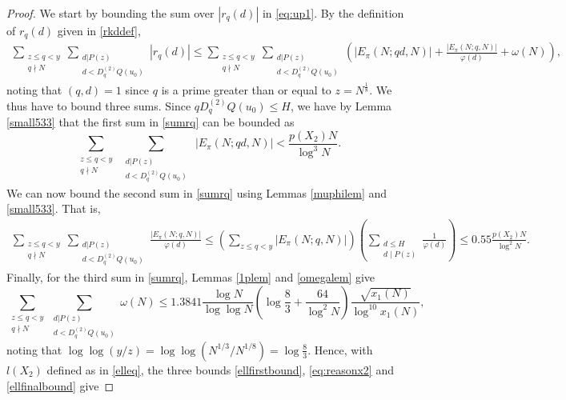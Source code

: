 \documentclass[12pt]{amsart}
\begin{document}
\begin{proof}
We start by bounding the sum over $|r_q(d)|$ in \eqref{eq:up1}. By the definition of $r_q(d)$ given in \eqref{rkddef},
\begin{align}\label{sumrq}
\sum_{\substack{z \le q < y\\q\nmid N}}\sum_{\substack{d|P(z)\\d<D^{(2)}_qQ(u_0)}}\left|r_{q} (d)\right|
\le \sum_{\substack{z \le q < y\\q\nmid N}}\sum_{\substack{d|P(z)\\d<D^{(2)}_qQ(u_0)}}\left(\left|E_{\pi}(N;qd,N)\right|+\frac{\left|E_{\pi}(N;q,N)\right|}{\varphi (d)}+\omega(N)\right),
\end{align}
noting that $(q,d)=1$ since $q$ is a prime greater than or equal to $z=N^{\frac{1}{8}}$. We thus have to bound three sums. Since $qD^{(2)}_qQ(u_0)\le H$, we have by Lemma \ref{small533} that the first sum in \eqref{sumrq} can be bounded as
\begin{equation}\label{ellfirstbound}
    \sum_{\substack{z \le q < y\\ q\nmid N}}\sum_{\substack{\substack{d|P(z)\\d<D^{(2)}_qQ(u_0)}}}\left|E_{\pi}(N;qd,N)\right| < \frac{p(X_2)N}{\log^3 N}.
\end{equation}
We can now bound the second sum in \eqref{sumrq} using Lemmas \ref{muphilem} and \ref{small533}. That is,
\begin{align}
\label{eq:reasonx2}
 \sum_{\substack{z \le q < y\\q\nmid N}}\sum_{\substack{d|P(z)\\d<D^{(2)}_qQ(u_0)}}\frac{\left|E_{\pi}(N;q,N)\right|}{\varphi (d)} \le \left(\sum_{z \le q < y} \left|E_{\pi}(N;q,N)\right| \right)\left( \sum_{\substack{d\le H\\ d\mid P(z)}}\frac{1}{\varphi (d)}\right)\le
0.55\frac{p(X_2)N}{\log^2N}.
\end{align}
Finally, for the third sum in \eqref{sumrq}, Lemmas \ref{1plem} and \ref{omegalem} give
\begin{equation}\label{ellfinalbound}
\sum_{\substack{z \le q < y\\q\nmid N}}\sum_{\substack{d|P(z)\\d<D^{(2)}_qQ(u_0)}}\omega(N)\le  1.3841\frac{\log N}{\log \log N}\left(\log \frac{8}{3}+\frac{64}{\log^2 N} \right)\frac{\sqrt{x_1(N)}}{\log^{10} x_1(N)},
\end{equation}
noting that $\log\log(y/z)=\log\log(N^{1/3}/N^{1/8})=\log\frac{8}{3}$. Hence, with $l(X_2)$ defined as in \eqref{elleq}, the three bounds \eqref{ellfirstbound}, \eqref{eq:reasonx2} and \eqref{ellfinalbound} give

\end{proof}
\end{document}
